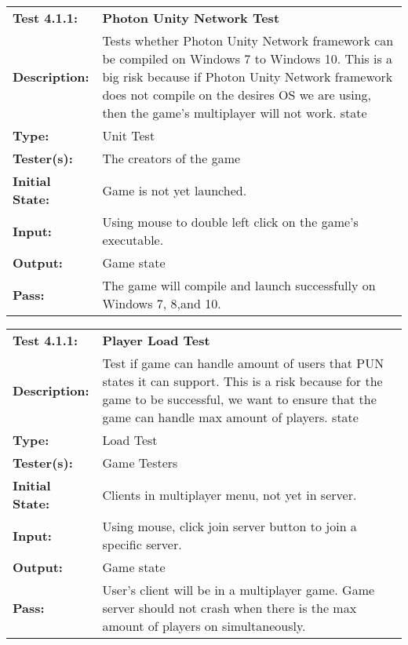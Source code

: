 \documentclass[12pt, titlepage]{article}
\begin{document}
\begin{enumerate}
\begin{mdframed}[linewidth=1pt]
\begin{tabularx}{\textwidth}{@{}p{3cm}X@{}}
{\bf Test 4.1.1:} & {\bf Photon Unity Network Test}\\[\baselineskip]
{\bf Description:} & Tests whether Photon Unity Network framework can be compiled on Windows 7 to Windows 10. This is a big risk because if Photon Unity Network framework does not compile on the desires OS we are using, then the game's multiplayer will not work. state\\[0.5\baselineskip]
{\bf Type:} & Unit Test\\[0.5\baselineskip]
{\bf Tester(s):} & The creators of the game\\[0.5\baselineskip]
{\bf Initial State:} & Game is not yet launched.\\[0.5\baselineskip]
{\bf Input:} & Using mouse to double left click on the game's executable.\\[0.5\baselineskip]
{\bf Output:} & Game state\\[0.5\baselineskip]
{\bf Pass:} & The game will compile and launch successfully on Windows 7, 8,and 10.
\end{tabularx}
\end{mdframed}

\begin{mdframed}[linewidth=1pt]
\begin{tabularx}{\textwidth}{@{}p{3cm}X@{}}
{\bf Test 4.1.1:} & {\bf Player Load Test}\\[\baselineskip]
{\bf Description:} & Test if game can handle amount of users that PUN states it can support. This is a risk because for the game to be successful, we want to ensure that the game can handle max amount of players. state\\[0.5\baselineskip]
{\bf Type:} & Load Test\\[0.5\baselineskip]
{\bf Tester(s):} & Game Testers\\[0.5\baselineskip]
{\bf Initial State:} & Clients in multiplayer menu, not yet in server.\\[0.5\baselineskip]
{\bf Input:} & Using mouse, click join server button to join a specific server.\\[0.5\baselineskip]
{\bf Output:} & Game state\\[0.5\baselineskip]
{\bf Pass:} & User's client will be in a multiplayer game. Game server should not crash when there is the max amount of players on simultaneously.
\end{tabularx}
\end{mdframed}


\end{enumerate}
\end{document}
